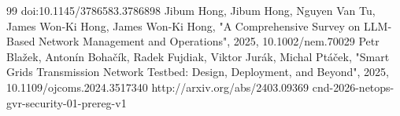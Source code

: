 \documentclass[conference]{IEEEtran}
\begin{document}
\begin{thebibliography}{99}
 doi:10.1145/3786583.3786898
 Jibum Hong, Jibum Hong, Nguyen Van Tu, James Won‐Ki Hong, James Won‐Ki Hong, "A Comprehensive Survey on LLM‐Based Network Management and Operations", 2025, 10.1002/nem.70029
 Petr Blažek, Antonín Bohačík, Radek Fujdiak, Viktor Jurák, Michal Ptáček, "Smart Grids Transmission Network Testbed: Design, Deployment, and Beyond", 2025, 10.1109/ojcoms.2024.3517340
 http://arxiv.org/abs/2403.09369
 cnd-2026-netops-gvr-security-01-prereg-v1
\end{thebibliography}
\end{document}
